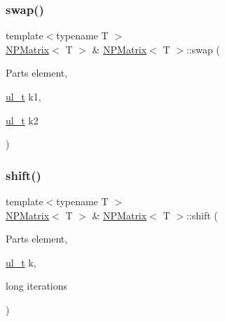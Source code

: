 \subsubsection{\texorpdfstring{swap()}{swap()}\hspace{0.1cm}{\footnotesize\ttfamily [2/2]}}
{\footnotesize\ttfamily template$<$typename T $>$ \\
\mbox{\hyperlink{class_n_p_matrix}{N\+P\+Matrix}}$<$ T $>$ \& \mbox{\hyperlink{class_n_p_matrix}{N\+P\+Matrix}}$<$ T $>$\+::swap (\begin{DoxyParamCaption}\item[{Parts}]{element,  }\item[{\mbox{\hyperlink{typedef_8h_a1b140a2034db3f5dfe18a987745df43a}{ul\+\_\+t}}}]{k1,  }\item[{\mbox{\hyperlink{typedef_8h_a1b140a2034db3f5dfe18a987745df43a}{ul\+\_\+t}}}]{k2 }\end{DoxyParamCaption})\hspace{0.3cm}{\ttfamily [protected]}}

\mbox{\label{class_n_p_matrix_a83118d4efa26372fd12bd0a2ce77f155}} 
\subsubsection{\texorpdfstring{shift()}{shift()}}
{\footnotesize\ttfamily template$<$typename T $>$ \\
\mbox{\hyperlink{class_n_p_matrix}{N\+P\+Matrix}}$<$ T $>$ \& \mbox{\hyperlink{class_n_p_matrix}{N\+P\+Matrix}}$<$ T $>$\+::shift (\begin{DoxyParamCaption}\item[{Parts}]{element,  }\item[{\mbox{\hyperlink{typedef_8h_a1b140a2034db3f5dfe18a987745df43a}{ul\+\_\+t}}}]{k,  }\item[{long}]{iterations }\end{DoxyParamCaption})\hspace{0.3cm}{\ttfamily [protected]}}

\mbox{\label{class_n_p_matrix_a4bff3c9956c688973307fd9c627e0ebd}} 
